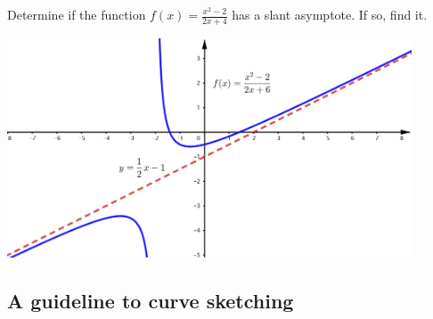 \begin{example}

Determine if the function \(f(x)=\frac{x^2-2}{2x+4}\) has a slant
asymptote. If so, find it.

\includegraphics[width=0.9\textwidth]{img/Slant-Asymptote.png}

\end{example}
\vspace*{6\baselineskip}

\hypertarget{a-guideline-to-curve-sketching}{%
\subsection{A guideline to curve
sketching}\label{a-guideline-to-curve-sketching}}

